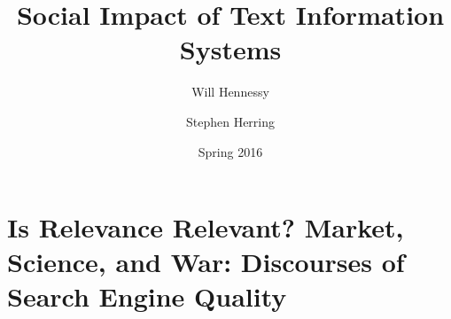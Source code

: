 \documentclass[11pt]{article}
\title{Social Impact of Text Information Systems}
\author{Will Hennessy \and Stephen Herring}
\date{Spring 2016}
\begin{document}
\maketitle


\newpage

%

\section*{Is Relevance Relevant? Market, Science, and War:  Discourses of Search Engine Quality}

\newpage

%

%

%

%

%

%

%

%
\end{document}
